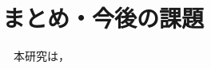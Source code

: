 \chapter{まとめ・今後の課題}

\begin{comment}
　本研究では，ネットワークシミュレータns-3 上でシミュレーションモデルの構築をおこなってきた．
なお，ns-3に関してC++で開発を行うことに関する日本語文献，大規模ネットワークの構築事例がこれまで存在せず，ソースコードも非常に僅かであることから，本研究はns-3上でのネットワーク構築マニュアルとして強く貢献することができる．
本論文のネットワーク構築法に基づいて，ns-3 上でシナリオを記述することで，意図した様々なネットワークを無料で構築することができる．
これにより，ns-3 上で構築した様々なネットワークの挙動確認や性能評価による改善点の発見を行えるだけでなく，本研究で使用した汎用的なモデルを利用し，新たなネットワークの性能評価を行う際のモデル化方法や，実装内容の指標とすることができる．

今後の課題は以下の通りである．
まず第一に挙げられるのが，ルータモジュールの完成である．
現在，ルータモジュールを表現するクラスとしてSimpleRouter，EunetRouterといったクラスを開発したが，現在はDCEによりQuaggaデーモンを利用して自動的にルーチング処理を行うようなルータしか開発できていない．
EUNETをモデル化するためにはVLANを設置しその設定を行うための機能追加が望まれる．
ルーチングアルゴリズムについても独自の変更を加えたアルゴリズムを用意する必要がある．EUNETではVLANを超えて送受信されるパケットを，一度最上位であるスーパーコアで検疫し，再度EUNET上に送信するような経路選択を行うよう設計しているためである．\\

次に，作成したモジュールを現在テストケースとして用いているEUNETのトポロジ記述クラスに反映させ，人間が把握できる程度の少ないパケットを流して解析し，大規模ネットワークにおいても作成したL3スイッチモジュールが正常に動作するのかの確認を行う必要がある．
EUNET独自のルーチングテーブルに従い，パケット伝送経路をたどるかパケットキャプチャを用いて解析し，評価を行う必要がある．

最後に，シミュレーションを行う場合に必要な項目としてパラメータを決定する基準を準備する必要がある．
EUNETに使用される機器についてのパラメータは，仕様書によりそのパラメータを設定する事ができるが，ネットワーク全体に流れるトラヒックを決定する事が問題となる．
パケットの種類・量などトラヒックに関するパラメータを設定する場合，数学的に予測を行うことで決定する事も可能である．\cite{torahikku}
しかしns-3の特徴として実際のトラヒックを用いることが可能であるので，この機能を用いることでEUNETにおいては現在使用されている愛媛大学ネットワーク上のトラヒックを計測，このトラヒックを用いてシミュレーションを行うことにより，より現実に近いモデル化を行うことができる．
このシミュレーションモデルを用いて性能評価を行うことが，本研究における最終目標であると言える．
\end{comment}

　本研究は，
